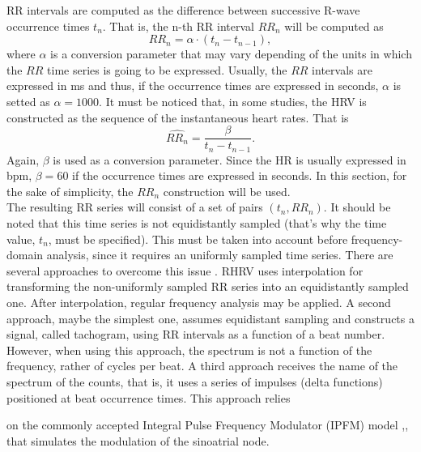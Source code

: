 \documentclass[12pt,lot, lof]{puthesis}
\begin{document}
RR intervals are computed as the difference between successive R-wave 
occurrence times $t_n$. That is, the n-th RR interval 
$RR_n$ will be computed as 
\begin{equation}
RR_n=\alpha \cdot (t_n-t_{n-1}),
\label{Eq:RR}
\end{equation}
where $\alpha$ is a conversion parameter that may vary depending of the units 
in which the $RR$ time series is going to be expressed. Usually, the $RR$ 
intervals are expressed in ms and thus, if the occurrence times are expressed 
in seconds, $\alpha$ is setted as $\alpha=1000$.
It must be noticed that, in some studies, the \gls{HRV} is constructed as the 
sequence of the instantaneous
heart rates.  That is
\begin{equation}
\widehat{RR_n}=\frac{\beta}{t_n-t_{n-1}}.
\label{Eq:RRinst}
\end{equation}
Again, $\beta$ is used as a conversion parameter. Since the \gls{HR} is usually 
expressed in \gls{bpm},  $\beta=60$ if the occurrence times are expressed in 
seconds.
In this section, for the sake of simplicity, the $RR_n$ construction will be 
used.\\

The resulting RR series will consist of a set of pairs $(t_n,RR_n)$. It should 
be noted that this time series is not equidistantly sampled 
(that's why the time value, $t_n$, must be specified). This must be taken into 
account before frequency-domain analysis, since it requires an uniformly 
sampled time series. 
There are several approaches  to overcome this issue \cite{forceHRV}. RHRV  
uses interpolation for transforming the non-uniformly sampled RR series into an 
equidistantly sampled one. After interpolation, regular frequency analysis may 
be applied. A second approach, maybe the simplest one, assumes equidistant 
sampling and constructs a signal, called tachogram, using RR intervals as a 
function of a beat number. However, when using this approach, the spectrum is 
not a function of the frequency, rather of cycles per beat. A third approach 
receives the name
of the spectrum of the counts, that is, it uses a series of impulses (delta 
functions) 
positioned at beat occurrence times. This approach relies

on the commonly accepted Integral Pulse Frequency Modulator (IPFM) model 
\cite{berger1986},\cite{hyndman}, that simulates the modulation of the 
sinoatrial node.\\
\end{document}
